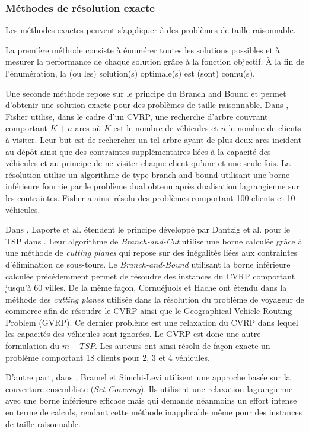 \subsubsection{Méthodes de résolution exacte}\label{resolutionExacteVRP}

Les méthodes exactes peuvent s'appliquer à des problèmes de taille raisonnable.

La première méthode consiste à énumérer toutes les solutions possibles et à mesurer la performance de chaque solution grâce à la fonction objectif. À la fin de l'énumération, la (ou les) solution(s) optimale(s) est (sont) connu(s).

Une seconde méthode repose sur le principe du Branch and Bound et permet d'obtenir une solution exacte pour des problèmes de taille raisonnable. Dans \cite{Fisher1994}, Fisher utilise, dans le cadre d'un CVRP, une recherche d'arbre couvrant comportant $K+n$ arcs où $K$ est le nombre de véhicules et $n$ le nombre de clients à visiter. Leur but est de rechercher un tel arbre ayant de plus deux arcs incident au dépôt ainsi que des contraintes supplémentaires liées à la capacité des véhicules et au principe de ne visiter chaque client qu'une et une seule fois. La résolution utilise un algorithme de type branch and bound utilisant une borne inférieure fournie par le problème dual obtenu après dualisation lagrangienne sur les contraintes. Fisher a ainsi résolu des problèmes comportant 100 clients et 10 véhicules. 

Dans \cite{Laporte1985}, Laporte et al. étendent le principe développé par Dantzig et al. pour le TSP dans \cite{Dantzig1954}.  Leur algorithme de \textit{Branch-and-Cut} utilise une borne calculée grâce à une méthode de \textit{cutting planes} qui repose sur des inégalités liées aux contraintes d'élimination de sous-tours. Le \textit{Branch-and-Bound} utilisant la borne inférieure calculée précédemment permet de résoudre des instances du CVRP comportant jusqu'à 60 villes.
De la même façon, Cornuéjuols et Hache ont étendu dans \cite{Cornuejols1993} la méthode des \textit{cutting planes} utilisée dans la résolution du problème de voyageur de commerce afin de résoudre le CVRP ainsi que le Geographical Vehicle Routing Problem (GVRP). Ce dernier problème est une relaxation du CVRP dans lequel les capacités des véhicules sont ignorées. Le GVRP est donc une autre formulation du $m-TSP$. Les auteurs ont ainsi résolu de façon exacte un problème comportant 18 clients pour 2, 3 et 4 véhicules.

D'autre part, dans \cite{Bramel2001}, Bramel et Simchi-Levi utilisent une approche basée sur la couverture ensembliste (\textit{Set Covering}). Ils utilisent une relaxation lagrangienne avec une borne inférieure efficace mais qui demande néanmoins un effort intense en terme de calculs, rendant cette méthode inapplicable même pour des instances de taille raisonnable.

